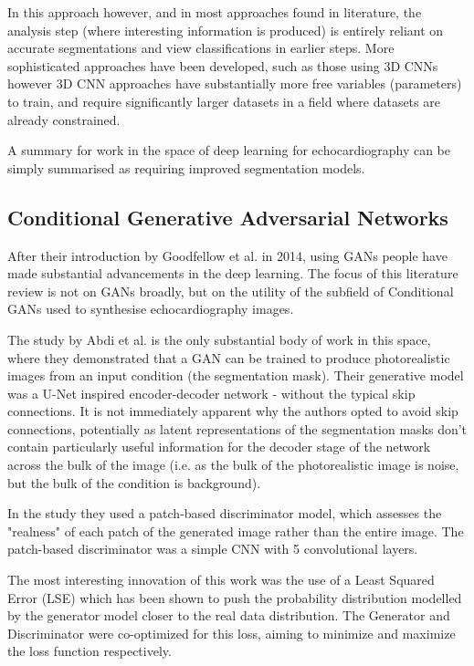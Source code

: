 In this approach however, and in most approaches found in literature, the
analysis step (where interesting information is produced) is entirely reliant on
accurate segmentations and view classifications in earlier steps. More
sophisticated approaches have been developed, such as those using 3D CNNs
\cite{ouyangEchoNetDynamicLargeNew} however 3D CNN approaches have substantially
more free variables (parameters) to train, and require significantly larger
datasets in a field where datasets are already constrained. \newline

A summary for work in the space of deep learning for echocardiography can be
simply summarised as requiring improved segmentation models. \newline

\subsection{Conditional Generative Adversarial Networks}

After their introduction by Goodfellow et al. in 2014, using GANs people have
made substantial advancements in the deep learning. The focus of this literature
review is not on GANs broadly, but on the utility of the subfield of Conditional
GANs used to synthesise echocardiography images. \newline

The study by Abdi et al. is the only substantial body of work in this space,
where they demonstrated that a GAN can be trained to produce photorealistic
images from an input condition (the segmentation mask). Their generative model
was a U-Net inspired encoder-decoder network - without the typical skip
connections. It is not immediately apparent why the authors opted to avoid skip
connections, potentially as latent representations of the segmentation masks
don't contain particularly useful information for the decoder stage of the
network across the bulk of the image (i.e. as the bulk of the photorealistic
image is noise, but the bulk of the condition is background). \newline

In the study they used a patch-based discriminator model, which assesses
the "realness" of each patch of the generated image rather than the entire
image. The patch-based discriminator was a simple CNN with 5 convolutional
layers. \newline

The most interesting innovation of this work was the use of a Least Squared
Error (LSE) which has been shown to push the probability distribution modelled
by the generator model closer to the real data distribution. The Generator and
Discriminator were co-optimized for this loss, aiming to minimize and maximize
the loss function respectively.\newline

